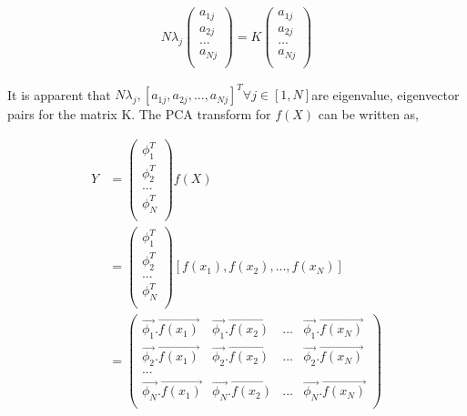 \documentclass[11pt, a4paper]{article}
\begin{document}
\begin{align*}
	N\lambda_j \begin{pmatrix}        
	a_{1j}                            \\
	a_{2j}                            \\
	...                               \\
	a_{Nj}                            \\
	\end{pmatrix} = K \begin{pmatrix} 
	a_{1j}                            \\
	a_{2j}                            \\
	...                               \\
	a_{Nj}                            \\
	\end{pmatrix}                     
\end{align*}

It is apparent that $N\lambda_j, [a_{1j}, a_{2j}, ..., a_{Nj}]^T \forall j \in [1, N]$are eigenvalue, eigenvector pairs for the matrix K. The PCA transform for $f(X)$ can be written as,

\begin{align*}
	Y &= \begin{pmatrix}
	\phi_1^T \\
	\phi_2^T \\
	... \\
	\phi_N^T \\
	\end{pmatrix} f(X) \\
	&= \begin{pmatrix}
	\phi_1^T \\
	\phi_2^T \\
	... \\
	\phi_N^T \\
	\end{pmatrix} [f(x_1), f(x_2), ..., f(x_N)] \\
	&= \begin{pmatrix}
	\vec{\phi_1}.\vec{f(x_1)} & \vec{\phi_1}.\vec{f(x_2)} & ... & \vec{\phi_1}.\vec{f(x_N)} \\
	\vec{\phi_2}.\vec{f(x_1)} & \vec{\phi_2}.\vec{f(x_2)} & ... & \vec{\phi_2}.\vec{f(x_N)} \\
	... \\
	\vec{\phi_N}.\vec{f(x_1)} & \vec{\phi_N}.\vec{f(x_2)} & ... & \vec{\phi_N}.\vec{f(x_N)} \\
	\end{pmatrix}       
\end{align*} 
\end{document}
